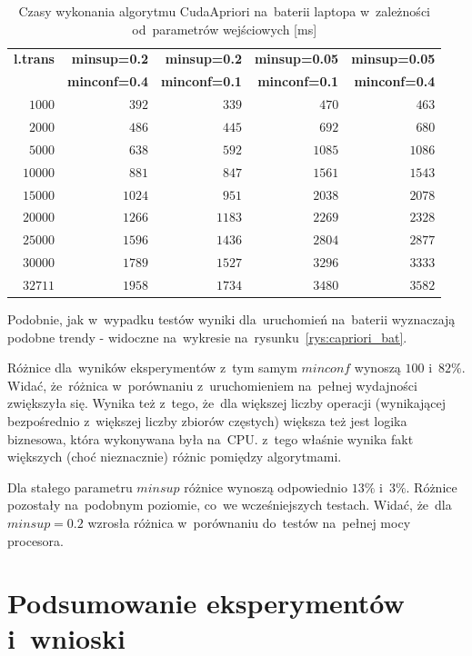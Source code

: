 \begin{table}
	\centering
	\begin{tabular}{r|r|r|r|r}
	\textbf{l.trans} & \textbf{minsup=0.2} & \textbf{minsup=0.2} & \textbf{minsup=0.05} & \textbf{minsup=0.05}  \\
	 & \textbf{minconf=0.4} & \textbf{minconf=0.1} & \textbf{minconf=0.1} & \textbf{minconf=0.4}  \\ \hline
	$1000$ & $392$ & $339$ & $470$ & $463$ \\
	$2000$ & $486$ & $445$ & $692$ & $680$ \\
	$5000$ & $638$ & $592$ & $1085$ & $1086$ \\
	$10000$ & $881$ & $847$ & $1561$ & $1543$ \\
	$15000$ & $1024$ & $951$ & $2038$ & $2078$ \\
	$20000$ & $1266$ & $1183$ & $2269$ & $2328$ \\
	$25000$ & $1596$ & $1436$ & $2804$ & $2877$ \\
	$30000$ & $1789$ & $1527$ & $3296$ & $3333$ \\
	$32711$ & $1958$ & $1734$ & $3480$ & $3582$ \\
	\end{tabular}
	\caption{Czasy wykonania algorytmu CudaApriori na~baterii laptopa w~zależności od~parametrów wejściowych [ms]\label{tab:capriori_bat}}
\end{table}

Podobnie, jak w~wypadku testów wyniki dla~uruchomień na~baterii wyznaczają podobne trendy - widoczne na~wykresie na~rysunku~\ref{rys:capriori_bat}.

Różnice dla~wyników eksperymentów z~tym samym $minconf$ wynoszą $100$ i~$82\%$. Widać, że~różnica w~porównaniu z~uruchomieniem na~pełnej wydajności zwiększyła się. Wynika też z~tego, że~dla większej liczby operacji (wynikającej bezpośrednio z~większej liczby zbiorów częstych) większa też jest logika biznesowa, która wykonywana była na~CPU. z~tego właśnie wynika fakt większych (choć nieznacznie) różnic pomiędzy algorytmami. 

Dla stałego parametru $minsup$ różnice wynoszą odpowiednio $13\%$ i~$3\%$. Różnice pozostały na~podobnym poziomie, co~we wcześniejszych testach. Widać, że~dla $minsup=0.2$ wzrosła różnica w~porównaniu do~testów na~pełnej mocy procesora.

\section{Podsumowanie eksperymentów i~wnioski}

